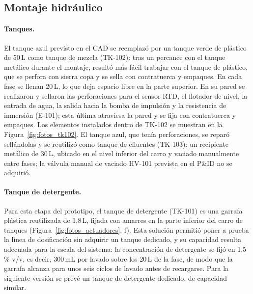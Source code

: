 \subsection{Montaje hidráulico}\label{sec:montaje_hidraulico}
 
\paragraph{Tanques.} El tanque azul previsto en el CAD se reemplazó por un tanque verde de plástico de 50\,L como tanque de mezcla (TK-102): tras un percance con el tanque metálico durante el montaje, resultó más fácil trabajar con el tanque de plástico, que se perfora con sierra copa y se sella con contratuerca y empaques. En cada fase se llenan 20\,L, lo que deja espacio libre en la parte superior. En su pared se realizaron y sellaron las perforaciones para el sensor RTD, el flotador de nivel, la entrada de agua, la salida hacia la bomba de impulsión y la resistencia de inmersión (E-101); esta última atraviesa la pared y se fija con contratuerca y empaques. Los elementos instalados dentro de TK-102 se muestran en la Figura~\ref{fig:fotos_tk102}. El tanque azul, que tenía perforaciones, se reparó sellándolas y se reutilizó como tanque de efluentes (TK-103): un recipiente metálico de 30\,L, ubicado en el nivel inferior del carro y vaciado manualmente entre fases; la válvula manual de vaciado HV-101 prevista en el P\&ID no se adquirió.

\paragraph{Tanque de detergente.} Para esta etapa del prototipo, el tanque de detergente (TK-101) es una garrafa plástica reutilizada de 1,8\,L, fijada con amarres en la parte inferior del carro de tanques (Figura~\ref{fig:fotos_actuadores}, f). Esta solución permitió poner a prueba la línea de dosificación sin adquirir un tanque dedicado, y su capacidad resulta adecuada para la escala del sistema: la concentración de detergente se fijó en 1,5\,\% v/v, es decir, 300\,mL por lavado sobre los 20\,L de la fase, de modo que la garrafa alcanza para unos seis ciclos de lavado antes de recargarse. Para la siguiente versión se prevé un tanque de detergente dedicado, de capacidad similar.
 
